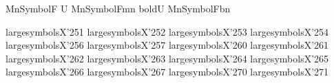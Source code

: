 \def\ps@headings{%
    \let\@oddfoot\@empty
	\def\@oddhead{{\scshape\rightmark}\hfil{\small\scshape\thepage}}%
    \let\@mkboth\markboth
    \def\sectionmark##1{%
      \markright {\MakeLowercase{%
        \ifnum \c@secnumdepth >\m@ne
          \thesection\quad
        \fi
        ##1}}}}        

\makeatother


\makeatletter
{}

  {MnSymbolF}{}
       {U}  {MnSymbolF}{m}{n}
     {bold}{U}  {MnSymbolF}{b}{n}

\def\Set@Mn@Sym#1{\@tempcnta #1\relax}
\def\Next@Mn@Sym{\advance\@tempcnta 1\relax}
\def\Prev@Mn@Sym{\advance\@tempcnta-1\relax}
\def\@Decl@Mn@Sym#1#2#3#4{\DeclareMathSymbol{#2}{#3}{#4}{#1}}
\def\Decl@Mn@Sym#1#2#3{%
  \if\relax\noexpand#1%
    \let#1\undefined
  \fi
  \expandafter\@Decl@Mn@Sym\expandafter{\the\@tempcnta}{#1}{#3}{#2}%
  \Next@Mn@Sym}
\def\Decl@Mn@Alias#1#2#3{\Prev@Mn@Sym\Decl@Mn@Sym{#1}{#2}{#3}}
\let\Decl@Mn@Char\Decl@Mn@Sym
\def\Decl@Mn@Op#1#2#3{\def#1{\DOTSB#3\slimits@}}
\def\Decl@Mn@Int#1#2#3{\def#1{\DOTSI#3\ilimits@}}

\let\sum\undefined
{}

\Decl@Mn@Op\sum\dsum\tsum

\makeatother

\makeatletter
{}


\DeclareMathSymbol{\downbrace}    {\mathord}{largesymbolsX}{'251}
\DeclareMathSymbol{\downbraceg}   {\mathord}{largesymbolsX}{'252}
\DeclareMathSymbol{\downbracegg}  {\mathord}{largesymbolsX}{'253}
\DeclareMathSymbol{\downbraceggg} {\mathord}{largesymbolsX}{'254}
\DeclareMathSymbol{\upbrace}      {\mathord}{largesymbolsX}{'256}
\DeclareMathSymbol{\upbraceg}     {\mathord}{largesymbolsX}{'257}
\DeclareMathSymbol{\upbracegg}    {\mathord}{largesymbolsX}{'260}
\DeclareMathSymbol{\upbraceggg}   {\mathord}{largesymbolsX}{'261}
\DeclareMathSymbol{\upbracegggg}  {\mathord}{largesymbolsX}{'262}
\DeclareMathSymbol{\braceld}      {\mathord}{largesymbolsX}{'263}
\DeclareMathSymbol{\bracelu}      {\mathord}{largesymbolsX}{'264}
\DeclareMathSymbol{\bracerd}      {\mathord}{largesymbolsX}{'265}
\DeclareMathSymbol{\braceru}      {\mathord}{largesymbolsX}{'266}
\DeclareMathSymbol{\bracemd}      {\mathord}{largesymbolsX}{'267}
\DeclareMathSymbol{\bracemu}      {\mathord}{largesymbolsX}{'270}
\DeclareMathSymbol{\bracemid}     {\mathord}{largesymbolsX}{'271}

